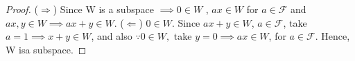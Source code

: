 \begin{proof}
	($\Rightarrow$) Since W is a subspace $\implies 0\in W$ , $ ax\in W $ for $a\in\mathcal{F}$ and $ax , y \in W \implies ax+y \in W$.
	($\Leftarrow$) $0\in W$. Since $ax+y\in W$, $a\in \mathcal{F}$, take $a= 1\implies x+y \in W$, and also $\because 0\in W,$ take $y=0\implies ax\in W$, for $a \in \mathcal{F}$. Hence, W isa subspace.   
\end{proof}